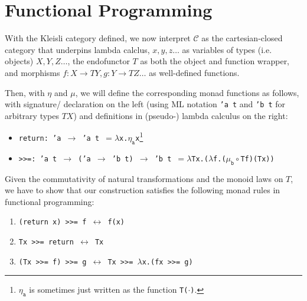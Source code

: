 \documentclass[11pt]{article}
\newcommand{\Cc}{\mathcal{C}}
\begin{document}
\section{Functional Programming}
With the Kleisli category defined, we now interpret $\Cc$ as the cartesian-closed category that underpins lambda calclus, $x, y, z \dots$ as variables of types (i.e. objects) $X, Y, Z \dots$, the endofunctor $T$ as both the object and function wrapper, and morphisms $f: X \rightarrow TY, g: Y \rightarrow TZ \dots$ as well-defined functions.

Then, with $\eta$ and $\mu$, we will define the corresponding monad functions as follows, with signature/ declaration on the left (using ML notation \texttt{'a t} and \texttt{'b t} for arbitrary types $TX$) and definitions in (pseudo-) lambda calculus on the right:
\begin{itemize}
\item \texttt{return: 'a $\rightarrow$ 'a t $ = \lambda$x.$\eta_{\texttt{a}}$x}\footnote{$\eta_{\texttt{a}}$ is sometimes just written as the function \texttt{T($\cdot$)}.}
\item \texttt{>>=: 'a t $\rightarrow$ ('a $\rightarrow$ 'b t) $\rightarrow$ 'b t $= \lambda$Tx.($\lambda$f.($\mu_{\texttt{b}}\circ$Tf)(Tx))}
\end{itemize}

Given the commutativity of natural transformations and the monoid laws on $T$, we have to show that our construction satisfies the following monad rules in functional programming:
\begin{enumerate}
    \item \texttt{(return x) >>= f $\longleftrightarrow $ f(x)}
    \item \texttt{Tx >>= return $\longleftrightarrow$ Tx}
    \item \texttt{(Tx >>= f) >>= g $\longleftrightarrow$ Tx >>= $\lambda$x.(fx >>= g)}
\end{enumerate}
\end{document}
